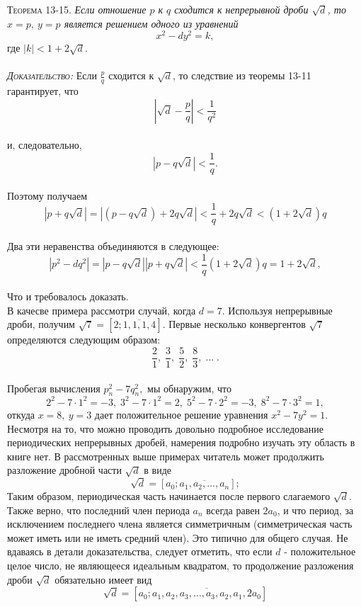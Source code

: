 \documentclass[twoside,12pt]{article}
\begin{document}
\noindent \textsc{Теорема 13-15.}\textit{ Если отношение $p$ к $q$ сходится к непрерывной дроби $\sqrt{d}$, то $x=p, \: y=p$ является решением одного из уравнений }
$$x^2 - dy^2 = k, $$
\noindent где $|k| < 1 + 2\sqrt{d}.$ \\ \\
\noindent \textsc{\textit{Доказательство:}} Если $\frac{p}{q}$ сходится к $\sqrt{d}$, то следствие из теоремы 13-11 гарантирует, что 
$$ |\sqrt{d} - \frac{p}{q}| < \frac{1}{q^2} $$ \\
\noindent и, следовательно, 
$$|p - q\sqrt{d}| < \frac{1}{q}. $$ \\
\noindent Поэтому получаем
$$|p + q\sqrt{d}| = |(p -q\sqrt{d}) + 2q\sqrt{d}| < \frac{1}{q} + 2q\sqrt{d}  < (1 + 2\sqrt{d})q$$ \\
\noindent Два эти неравенства объединяются в следующее:
$$|p^2 - dq^2| = |p - q\sqrt{d}| |p + q\sqrt{d} | < \frac{1}{q}(1 + 2\sqrt{d})q = 1 + 2\sqrt{d}, $$ \\
\noindent Что и требовалось доказать. \\
\indent В качесве примера рассмотри случай, когда $d = 7$. Используя непрерывные дроби, получим $\sqrt{7} = [2;\overline{1,1,1,4}]$. Первые несколько конвергентов $\sqrt{7}$ определяются следующим образом:
$$\frac{2}{1}, \; \frac{3}{1}, \; \frac{5}{2}, \; \frac{8}{3}, \; ... \;.$$ \\
\noindent Пробегая вычисления $p_n^2 - 7q_n^2 ,$ мы обнаружим, что
$$2^2 - 7\cdot 1^2 = -3, \; 3^2 - 7\cdot 1^2 = 2, \; 5^2 - 7 \cdot 2^2 = -3, \; 8^2 - 7\cdot 3^2 =1, $$ 
\noindent откуда $ x = 8, \: y = 3$ дает положительное решение уравнения $x^2 - 7y^2 = 1.$ \\
\indent Несмотря на то, что можно проводить довольно подробное исследование периодических непрерывных дробей, намерения подробно изучать эту область в книге нет. В рассмотренных выше примерах читатель может продолжить разложение дробной части $\sqrt{d}$ в виде
$$\sqrt{d} = [a_0;\overline{a_1,a_2,\ldots,a_n}];$$ 
\noindent Таким образом, периодическая часть начинается после первого слагаемого $\sqrt{d}$. Также верно, что последний член периода $a_n$ всегда равен $2a_0$, и что период, за исключением последнего члена является симметричным (симметрическая часть может иметь или не иметь средний член). Это типично для общего случая.
Не вдаваясь в детали доказательства, следует отметить, что если $d$ - положительное целое число, не являющееся идеальным квадратом, то продолжение разложения дроби $\sqrt{d}$ обязательно имеет вид
$$\sqrt{d} = [a_0; \overline{a_1, a_2, a_3, \ldots , a_3,a_2,a_1,2a_0}] $$
\end{document}
